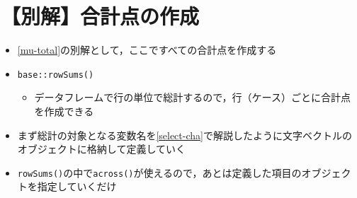 \documentclass[
  xelatex,ja=standard, b5paper]{bxjsbook}
\providecommand{\tightlist}{%
  \setlength{\itemsep}{0pt}\setlength{\parskip}{0pt}}
\begin{document}
\hypertarget{mu-total-ef}{%
\section{【別解】合計点の作成}\label{mu-total-ef}}

\begin{itemize}
\tightlist
\item
  \ref{mu-total}の別解として，ここですべての合計点を作成する
\item
  \texttt{base::rowSums()}

  \begin{itemize}
  \tightlist
  \item
    データフレームで行の単位で総計するので，行（ケース）ごとに合計点を作成できる
  \end{itemize}
\item
  まず総計の対象となる変数名を\ref{select-cha}で解説したように文字ベクトルのオブジェクトに格納して定義していく
\item
  \texttt{rowSums()}の中で\texttt{across()}が使えるので，あとは定義した項目のオブジェクトを指定していくだけ
\end{itemize}
\end{document}
